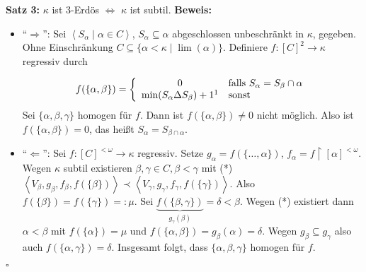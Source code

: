 \documentclass[a4paper,fontsize=11pt]{scrartcl}
\begin{document}
{\bf Satz 3:} $\kappa$ ist $3$-Erdös $\Leftrightarrow$ $\kappa$ ist subtil.
{\bf Beweis:}
\begin{itemize}
  \item ``$\Rightarrow$'': Sei $\left<S_\alpha\mid\alpha\in C\right>$,
    $S_\alpha\subseteq\alpha$ abgeschlossen unbeschränkt in $\kappa$,
    gegeben. Ohne Einschränkung
    $C\subseteq\{\alpha<\kappa\mid\lim(\alpha)\}$. Definiere
    $f:[C]^2\rightarrow\kappa$ regressiv durch

    $$ f(\{\alpha,\beta\}) = \left\{ \begin{array}{cl} 0 & \mbox{falls
      } S_\alpha = S_\beta \cap \alpha \\ \min(S_\alpha\Delta
      S_\beta)+1\footnotemark &
      \mbox{sonst} \end{array}\right.$$
    Sei $\{\alpha,\beta,\gamma\}$ homogen für $f$. Dann ist
    $f(\{\alpha,\beta\})\neq 0$ nicht möglich. Also ist
    $f(\{\alpha,\beta\})=0$, das heißt $S_\alpha=S_{\beta\cap\alpha}$.
  \item ``$\Leftarrow$'': Sei $f:[C]^{<\omega}\rightarrow\kappa$
    regressiv. Setze $g_\alpha=f(\{\ldots,\alpha\})$,
    $f_\alpha=f\upharpoonright[\alpha]^{<\omega}$. Wegen $\kappa$
    subtil existieren $\beta,\gamma\in C, \beta < \gamma$ mit
    (*)$\left<V_\beta, g_\beta, f_\beta, f(\{\beta\})\right> \prec
    \left< V_\gamma, g_\gamma, f_\gamma, f(\{\gamma\}) \right>$. Also
    $f(\{\beta\})=f(\{\gamma\})=:\mu$. Sei
    $\underbrace{f(\{\beta,\gamma\})}_{g_\gamma(\beta)} = \delta <
    \beta$. Wegen (*) existiert dann $\alpha<\beta$ mit
    $f(\{\alpha\})=\mu$ und
    $f(\{\alpha,\beta\})=g_\beta(\alpha)=\delta$. Wegen
    $g_\beta\subseteq g_\gamma$ also auch
    $f(\{\alpha,\gamma\})=\delta$. Insgesamt folgt, dass $\{\alpha,
    \beta, \gamma\}$ homogen für $f$.
\end{itemize}
\hfill $\square$
\end{document}

